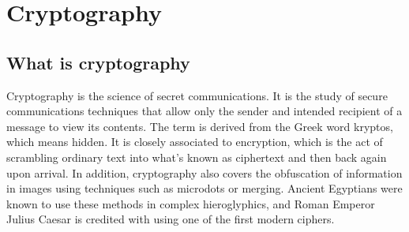 \documentclass{report}
\theoremstyle{definition}
\begin{document}
\tableofcontents
\chapter{ Cryptography }
\section{ What is cryptography}

\Large{ Cryptography is the science of secret communications.
It is the study of secure communications techniques that allow only the sender and intended recipient of a message to view its contents. The term is derived from the Greek word kryptos, which means hidden. It is closely associated to encryption, which is the act of scrambling ordinary text into what's known as ciphertext and then back again upon arrival. In addition, cryptography also covers the obfuscation of information in images using techniques such as microdots or merging. Ancient Egyptians were known to use these methods in complex hieroglyphics, and Roman Emperor Julius Caesar is credited with using one of the first modern ciphers.


}
\end{document}
